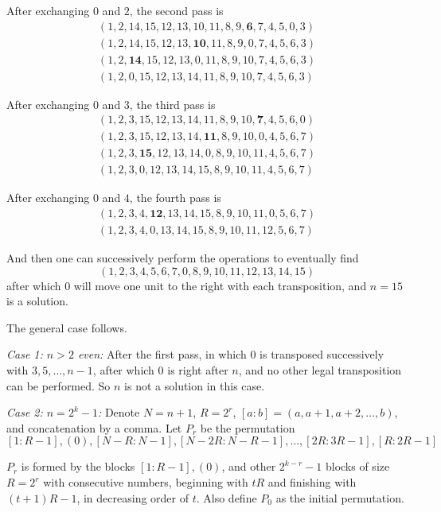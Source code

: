 \documentclass[12pt,oneside,a4paper]{book}
\begin{document}
After exchanging $0$ and $2$, the second pass is
\begin{gather*}
(1,2,14,15,12,13,10,11,8,9,\mathbf{6},7,4,5,0,3)\\
(1,2,14,15,12,13,\mathbf{10},11,8,9,0,7,4,5,6,3)\\
(1,2,\mathbf{14},15,12,13,0,11,8,9,10,7,4,5,6,3)\\
(1,2,0,15,12,13,14,11,8,9,10,7,4,5,6,3)
\end{gather*}

After exchanging $0$ and $3$, the third pass is
\begin{gather*}
(1,2,3,15,12,13,14,11,8,9,10,\mathbf{7},4,5,6,0)\\
(1,2,3,15,12,13,14,\mathbf{11},8,9,10,0,4,5,6,7)\\
(1,2,3,\mathbf{15},12,13,14,0,8,9,10,11,4,5,6,7)\\
(1,2,3,0,12,13,14,15,8,9,10,11,4,5,6,7)
\end{gather*}

After exchanging $0$ and $4$, the fourth pass is
\begin{gather*}
(1,2,3,4,\textbf{12},13,14,15,8,9,10,11,0,5,6,7)\\
(1,2,3,4,0,13,14,15,8,9,10,11,12,5,6,7)
\end{gather*}

And then one can successively perform the operations to eventually find
\[(1,2,3,4,5,6,7,0,8,9,10,11,12,13,14,15)\]
after which $0$ will move one unit to the right with each transposition, and $n=15$ is a solution.

The general case follows.

\emph{Case 1: $n>2$ even:} After the first pass, in which $0$ is transposed successively with $3,5,\ldots,n-1$, after which $0$ is right after $n$, and no other legal transposition can be performed. So $n$ is not a solution in this case.

\smallskip
\emph{Case 2: $n=2^k-1$:} Denote $N=n+1$, $R=2^r$, $[a:b] = (a,a+1,a+2,\ldots,b)$, and concatenation by a comma. Let $P_r$ be the permutation
\[[1:R-1],(0),[N-R:N-1],[N-2R:N-R-1],\ldots,[2R:3R-1],[R:2R-1]\]

$P_r$ is formed by the blocks $[1:R-1],(0)$, and other $2^{k-r}-1$ blocks of size $R=2^r$ with consecutive numbers, beginning with $tR$ and finishing with $(t+1)R-1$, in decreasing order of $t$. Also define $P_0$ as the initial permutation.
\end{document}
